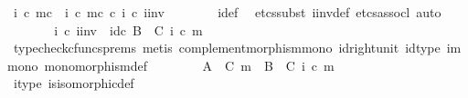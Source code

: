 \begin{isabellebody}
\ {\isachardoublequoteopen}{\isacharparenleft}{\kern0pt}i\ {\isasymcirc}\isactrlsub c\ m{\isacharparenright}{\kern0pt}\isactrlsup c\ {\isacharequal}{\kern0pt}\ {\isacharparenleft}{\kern0pt}i\ {\isasymcirc}\isactrlsub c\ m{\isacharparenright}{\kern0pt}\isactrlsup c\ {\isasymcirc}\isactrlsub c\ i{\isacharprime}{\kern0pt}\ {\isasymcirc}\isactrlsub c\ i{\isacharprime}{\kern0pt}{\isacharunderscore}{\kern0pt}inv{\isachardoublequoteclose}\isanewline
\ \ \ \ \ \ \isamarkupfalse%
\ i{\isacharprime}{\kern0pt}{\isacharunderscore}{\kern0pt}def\ \isamarkupfalse%
\ {\isacharparenleft}{\kern0pt}etcs{\isacharunderscore}{\kern0pt}subst\ i{\isacharprime}{\kern0pt}{\isacharunderscore}{\kern0pt}inv{\isacharunderscore}{\kern0pt}def{\isacharcomma}{\kern0pt}\ etcs{\isacharunderscore}{\kern0pt}assocl{\isacharcomma}{\kern0pt}\ auto{\isacharparenright}{\kern0pt}\isanewline
\ \ \ \ \isamarkupfalse%
\ \isamarkupfalse%
\ {\isachardoublequoteopen}i{\isacharprime}{\kern0pt}\ {\isasymcirc}\isactrlsub c\ i{\isacharprime}{\kern0pt}{\isacharunderscore}{\kern0pt}inv\ {\isacharequal}{\kern0pt}\ id\isactrlsub c\ {\isacharparenleft}{\kern0pt}B\ {\isasymsetminus}\ {\isacharparenleft}{\kern0pt}C{\isacharcomma}{\kern0pt}\ i\ {\isasymcirc}\isactrlsub c\ m{\isacharparenright}{\kern0pt}{\isacharparenright}{\kern0pt}{\isachardoublequoteclose}\isanewline
\ \ \ \ \ \ \isamarkupfalse%
\ {\isacharparenleft}{\kern0pt}typecheck{\isacharunderscore}{\kern0pt}cfuncs{\isacharunderscore}{\kern0pt}prems{\isacharcomma}{\kern0pt}\ metis\ complement{\isacharunderscore}{\kern0pt}morphism{\isacharunderscore}{\kern0pt}mono\ id{\isacharunderscore}{\kern0pt}right{\isacharunderscore}{\kern0pt}unit{}\ id{\isacharunderscore}{\kern0pt}type\ im{\isacharunderscore}{\kern0pt}mono\ monomorphism{\isacharunderscore}{\kern0pt}def{}{\isacharparenright}{\kern0pt}\isanewline
\ \ \isamarkupfalse%
\isanewline
\ \ \isamarkupfalse%
\ \isamarkupfalse%
\ {\isachardoublequoteopen}A\ {\isasymsetminus}\ {\isacharparenleft}{\kern0pt}C{\isacharcomma}{\kern0pt}\ m{\isacharparenright}{\kern0pt}\ {\isasymcong}\ B\ {\isasymsetminus}\ {\isacharparenleft}{\kern0pt}C{\isacharcomma}{\kern0pt}\ i\ {\isasymcirc}\isactrlsub c\ m{\isacharparenright}{\kern0pt}{\isachardoublequoteclose}\isanewline
\ \ \ \ \isamarkupfalse%
\ i{\isacharprime}{\kern0pt}{\isacharunderscore}{\kern0pt}type\ is{\isacharunderscore}{\kern0pt}isomorphic{\isacharunderscore}{\kern0pt}def\ \isamarkupfalse%

\end{isabellebody}
